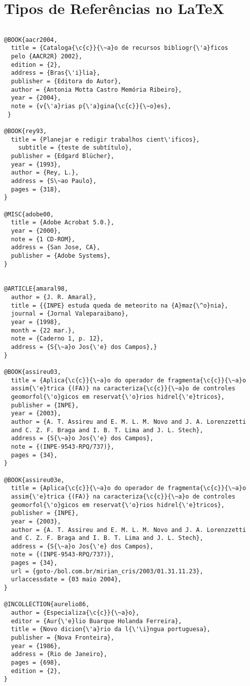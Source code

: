 \chapter{Tipos de Referências no \LaTeX}
\label{anexoC}

\begin{verbatim}

@BOOK{aacr2004, 
  title = {Cataloga{\c{c}}{\~a}o de recursos bibliogr{\'a}ficos 
  pelo {AACR2R} 2002}, 
  edition = {2},
  address = {Bras{\'i}lia},
  publisher = {Editora do Autor},
  author = {Antonia Motta Castro Memória Ribeiro},
  year = {2004}, 
  note = {v{\'a}rias p{\'a}gina{\c{c}}{\~o}es},
 }

@BOOK{rey93,
  title = {Planejar e redigir trabalhos cient\'ificos},
	subtitle = {teste de subtítulo},
  publisher = {Edgard Blücher},
  year = {1993},
  author = {Rey, L.},
  address = {S\~ao Paulo},
  pages = {318},
} 

@MISC{adobe00,
  title = {Adobe Acrobat 5.0.},
  year = {2000},
  note = {1 CD-ROM},
  address = {San Jose, CA},
  publisher = {Adobe Systems},
}


@ARTICLE{amaral98,
  author = {J. R. Amaral},
  title = {{INPE} estuda queda de meteorito na {A}maz{\^o}nia},
  journal = {Jornal Valeparaibano},
  year = {1998},
  month = {22 mar.},
  note = {Caderno 1, p. 12},
  address = {S{\~a}o Jos{\'e} dos Campos},}
}

@BOOK{assireu03,
  title = {Aplica{\c{c}}{\~a}o do operador de fragmenta{\c{c}}{\~a}o  
  assim{\'e}trica {(FA)} na caracteriza{\c{c}}{\~a}o de controles 
  geomorfol{\'o}gicos em reservat{\'o}rios hidrel{\'e}tricos},
  publisher = {INPE},
  year = {2003},
  author = {A. T. Assireu and E. M. L. M. Novo and J. A. Lorenzzetti 
  and C. Z.	F. Braga and I. B. T. Lima and J. L. Stech},
  address = {S{\~a}o Jos{\'e} dos Campos},
  note = {(INPE-9543-RPQ/737)},
  pages = {34},
}

@BOOK{assireu03e,
  title = {Aplica{\c{c}}{\~a}o do operador de fragmenta{\c{c}}{\~a}o 
  assim{\'e}trica {(FA)} na caracteriza{\c{c}}{\~a}o de controles 
  geomorfol{\'o}gicos em reservat{\'o}rios hidrel{\'e}tricos},
  publisher = {INPE},
  year = {2003},
  author = {A. T. Assireu and E. M. L. M. Novo and J. A. Lorenzzetti 
  and C. Z.	F. Braga and I. B. T. Lima and J. L. Stech},
  address = {S{\~a}o Jos{\'e} dos Campos},
  note = {(INPE-9543-RPQ/737)},
  pages = {34},
  url = {goto-/bol.com.br/mirian_cris/2003/01.31.11.23},
  urlaccessdate = {03 maio 2004},
}

@INCOLLECTION{aurelio86, 
  author = {Especializa{\c{c}}{\~a}o},
  editor = {Aur{\'e}lio Buarque Holanda Ferreira},  
  title = {Novo dicion{\'a}rio da l{\'\i}ngua portuguesa},
  publisher = {Nova Fronteira},
  year = {1986},
  address = {Rio de Janeiro}, 
  pages = {698},
  edition = {2},
}


\end{verbatim}
